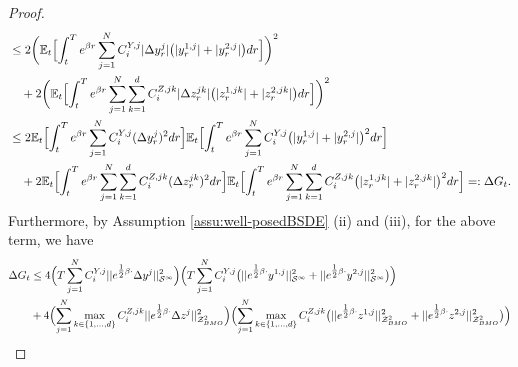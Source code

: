 \documentclass[10pt,a4paper]{article}
\theoremstyle{plain}
\theoremstyle{definition}
\numberwithin{equation}{section}
\begin{document}
\begin{proof}
\begin{align*}
&\leq 2\biggl(\mathbb{E}_{t}\Bigl[\int_{t}^{T}e^{\beta r}\sum_{j=1}^{N}C_{i}^{Y,j}|\Delta y_{r}^{j}|\bigl(|y_{r}^{1,j}| + |y_{r}^{2,j}|\bigr)dr\Bigr]\biggr)^{2} \\
&\ \ \ + 2\biggl(\mathbb{E}_{t}\Bigl[\int_{t}^{T}e^{\beta r}\sum_{j=1}^{N}\sum_{k=1}^{d}C_{i}^{Z,jk}|\Delta z_{r}^{jk}|\bigl(|z_{r}^{1,jk}| + |z_{r}^{2,jk}|\bigr)dr\Bigr]\biggr)^{2} \nonumber \\
&\leq 2\mathbb{E}_{t}\Bigl[\int_{t}^{T}e^{\beta r}\sum_{j=1}^{N}C_{i}^{Y,j}(\Delta y_{r}^{j})^{2}dr\Bigr]\mathbb{E}_{t}\Bigl[\int_{t}^{T}e^{\beta r}\sum_{j=1}^{N}C_{i}^{Y,j}\bigl(|y_{r}^{1,j}| + |y_{r}^{2,j}|\bigr)^{2}dr\Bigr] \nonumber \\
&\ \ \ + 2\mathbb{E}_{t}\Bigl[\int_{t}^{T}e^{\beta r}\sum_{j=1}^{N}\sum_{k=1}^{d}C_{i}^{Z,jk}(\Delta z_{r}^{jk})^{2}dr\Bigr]\mathbb{E}_{t}\Bigl[\int_{t}^{T}e^{\beta r}\sum_{j=1}^{N}\sum_{k=1}^{d}C_{i}^{Z,jk}\bigl(|z_{r}^{1,jk}| + |z_{r}^{2,jk}|\bigr)^{2}dr\Bigr]=:\Delta G_t. \nonumber
\end{align*}
Furthermore, by Assumption \ref{assu:well-posedBSDE} (ii) and (iii), for the above term, we have
\begin{align}
\Delta G_t&\leq 4\Bigl(T\sum_{j=1}^{N}C_{i}^{Y,j}||e^{\tfrac{1}{2}\beta\cdot}\Delta y^{j}||_{\mathcal{S}^{\infty}}^{2}\Bigr)\Bigr(T\sum_{j=1}^{N}C_{i}^{Y,j}\bigl(||e^{\tfrac{1}{2}\beta\cdot}y^{1,j}||_{\mathcal{S}^{\infty}}^{2} + ||e^{\tfrac{1}{2}\beta\cdot}y^{2,j}||_{\mathcal{S}^{\infty}}^{2}\bigr)\Bigr) \nonumber \\
&+ 4\Bigl(\sum_{j=1}^{N}\max_{k \in \{1,...,d\}}C_{i}^{Z,jk}||e^{\tfrac{1}{2}\beta\cdot}\Delta z^{j}||_{\mathcal{Z}_{BMO}^{2}}^{2}\Bigr)\Bigl(\sum_{j=1}^{N}\max_{k \in \{1,...,d\}}C_{i}^{Z,jk}\bigl(||e^{\tfrac{1}{2}\beta\cdot}z^{1,j}||_{\mathcal{Z}_{BMO}^{2}}^{2} + ||e^{\tfrac{1}{2}\beta\cdot}z^{2,j}||_{\mathcal{Z}_{BMO}^{2}}^{2}\bigr)\Bigr) \nonumber \\

\end{align}
\end{proof}
\end{document}
